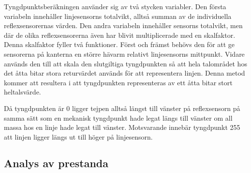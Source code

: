 Tyngdpunktsberäkningen använder sig av två stycken variabler. Den första variabeln innehåller linjesensorns totalvikt, alltså summan av de individuella reflexsensorernas värden. Den andra variabeln innehåller sensorns totalvikt, men där de olika reflexsensorerna även har blivit multiplicerade med en skalfaktor. Denna skalfaktor fyller två funktioner. Först och främst behövs den för att ge sensorerna på kanterna en större hävarm relativt linjesensorns mittpunkt. Vidare används den till att skala den slutgiltiga tyngdpunkten så att hela talområdet hos det åtta bitar stora returvärdet används för att representera linjen. Denna metod kommer att resultera i att tyngdpunkten representeras av ett åtta bitar stort heltalsvärde.

Då tyngdpunkten är 0 ligger tejpen alltså längst till vänster på reflexsensorn på samma sätt som en mekanisk tyngdpunkt hade legat längs till vänster om all massa hos en linje hade legat till vänster. Motsvarande innebär tyngdpunkt 255 att linjen ligger längs ut till höger på linjesensorn.

\subsection{Analys av prestanda}








